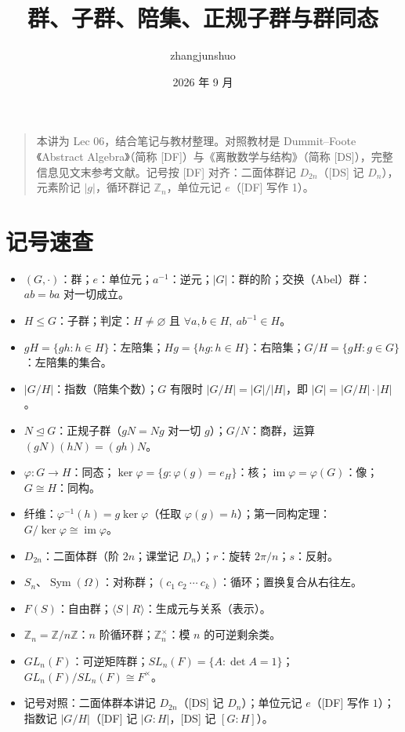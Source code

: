 \documentclass[UTF8,a4paper,11pt]{ctexart}
\title{群、子群、陪集、正规子群与群同态}
\author{zhangjunshuo}\date{2026 年 9 月}
\begin{document}
\maketitle
\begin{quote}
本讲为 Lec 06，结合笔记与教材整理。对照教材是 Dummit--Foote《Abstract Algebra》（简称 [DF]）与《离散数学与结构》（简称 [DS]），完整信息见文末参考文献。记号按 [DF] 对齐：二面体群记 $D_{2n}$（[DS] 记 $D_n$），元素阶记 $|g|$，循环群记 $\mathbb Z_n$，单位元记 $e$（[DF] 写作 1）。
\end{quote}
\tableofcontents\clearpage

\section*{记号速查}
\begin{itemize}
\item $(G,\cdot)$：群；$e$：单位元；$a^{-1}$：逆元；$|G|$：群的阶；交换（Abel）群：$ab=ba$ 对一切成立。
\item $H\le G$：子群；判定：$H\ne\varnothing$ 且 $\forall a,b\in H,\ ab^{-1}\in H$。
\item $gH=\{gh:h\in H\}$：左陪集；$Hg=\{hg:h\in H\}$：右陪集；$G/H=\{gH:g\in G\}$：左陪集的集合。
\item $|G/H|$：指数（陪集个数）；$G$ 有限时 $|G/H|=|G|/|H|$，即 $|G|=|G/H|\cdot|H|$。
\item $N\trianglelefteq G$：正规子群（$gN=Ng$ 对一切 $g$）；$G/N$：商群，运算 $(gN)(hN)=(gh)N$。
\item $\varphi:G\to H$：同态；$\ker\varphi=\{g:\varphi(g)=e_H\}$：核；$\operatorname{im}\varphi=\varphi(G)$：像；$G\cong H$：同构。
\item 纤维：$\varphi^{-1}(h)=g\ker\varphi$（任取 $\varphi(g)=h$）；第一同构定理：$G/\ker\varphi\cong\operatorname{im}\varphi$。
\item $D_{2n}$：二面体群（阶 $2n$；课堂记 $D_n$）；$r$：旋转 $2\pi/n$；$s$：反射。
\item $S_n$、$\operatorname{Sym}(\Omega)$：对称群；$(c_1\ c_2\ \cdots\ c_k)$：循环；置换复合从右往左。
\item $F(S)$：自由群；$\langle S\mid R\rangle$：生成元与关系（表示）。
\item $\mathbb Z_n=\mathbb Z/n\mathbb Z$：$n$ 阶循环群；$\mathbb Z_n^\times$：模 $n$ 的可逆剩余类。
\item $GL_n(F)$：可逆矩阵群；$SL_n(F)=\{A:\det A=1\}$；$GL_n(F)/SL_n(F)\cong F^\times$。
\item 记号对照：二面体群本讲记 $D_{2n}$（[DS] 记 $D_n$）；单位元记 $e$（[DF] 写作 $1$）；指数记 $|G/H|$（[DF] 记 $|G:H|$，[DS] 记 $[G:H]$）。
\end{itemize}
\clearpage
\end{document}
